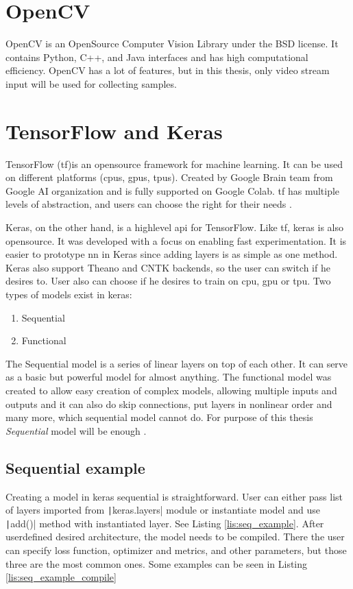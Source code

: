 \documentclass[thesis=B,english]{FITthesis}[2019/12/23]
\begin{document}
\section{OpenCV}
OpenCV is an OpenSource Computer Vision Library \cite{opencv_2020} under the BSD license. It contains Python, C++, and Java interfaces and has high computational efficiency. OpenCV has a lot of features, but in this thesis, only video stream input will be used for collecting samples. 

\section{TensorFlow and Keras}
TensorFlow (\gls{tf})is an opensource framework for machine learning. It can be used on different platforms (\gls{cpu}s, \gls{gpu}s, \gls{tpu}s). Created by Google Brain team from Google AI organization and is fully supported on Google Colab. \gls{tf} has multiple levels of abstraction, and users can choose the right for their needs \cite{google_brain}. 

Keras, on the other hand, is a highlevel \gls{api} for TensorFlow. Like \gls{tf}, keras is also opensource. It was developed with a focus on enabling fast experimentation. It is easier to prototype \gls{nn} in Keras since adding layers is as simple as one method. Keras also support Theano \cite{theano} and CNTK \cite{microsoft_2020} backends, so the user can switch if he desires to. User also can choose if he desires to train on \gls{cpu}, \gls{gpu} or \gls{tpu}. Two types of models exist in keras:

\begin{enumerate}
    \item Sequential
    \item Functional
\end{enumerate}

The Sequential model is a series of linear layers on top of each other. It can serve as a basic but powerful model for almost anything. The functional model was created to allow easy creation of complex models, allowing multiple inputs and outputs and it can also do skip connections, put layers in nonlinear order and many more, which sequential model cannot do. For purpose of this thesis \emph{Sequential} model will be enough \cite{keras_main, keras_sequential, keras_functional}.

\subsection{Sequential example}
Creating a model in keras sequential is straightforward. User can either pass list of layers imported from \texttt|keras.layers| module or instantiate model and use \texttt|add()| method with instantiated layer. See Listing \ref{lis:seq_example}. After userdefined desired architecture, the model needs to be compiled. There the user can specify loss function, optimizer and metrics, and other parameters, but those three are the most common ones. Some examples can be seen in Listing \ref{lis:seq_example_compile}
\end{document}
